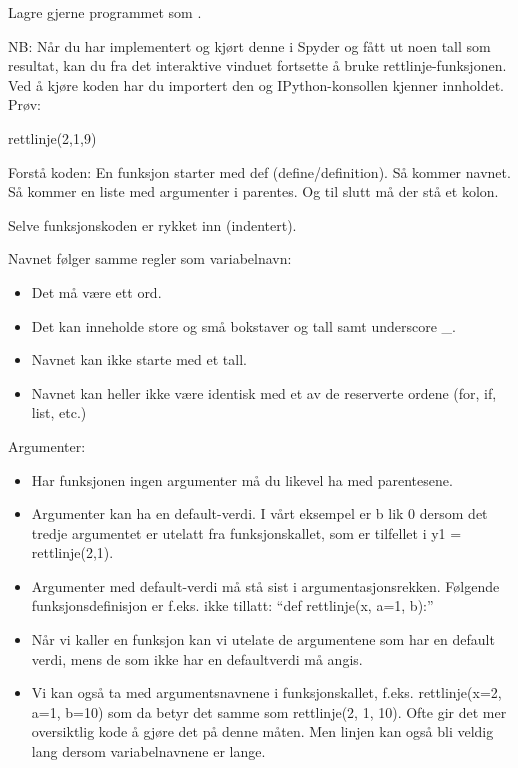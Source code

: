 {Lagre gjerne programmet som .

NB: Når du har implementert og kjørt denne i Spyder og fått ut noen tall som resultat, kan du fra det interaktive vinduet fortsette å bruke rettlinje-funksjonen. Ved å kjøre koden har du importert den og IPython-konsollen kjenner innholdet. 
Prøv:

\begin{usncodebox}
rettlinje(2,1,9) 
\end{usncodebox}

Forstå koden:
En funksjon starter med def (define/definition). Så kommer navnet. Så kommer en liste med argumenter i parentes. Og til slutt må der stå et kolon. 

Selve funksjonskoden er rykket inn (indentert).

Navnet følger samme regler som variabelnavn:
\begin{itemize}
\item Det må være ett ord.
\item Det kan inneholde store og små bokstaver og tall samt underscore \_.
\item Navnet kan ikke starte med et tall.
\item Navnet kan heller ikke være identisk med et av de reserverte ordene (for, if, list, etc.) 
\end{itemize}

Argumenter:
\begin{itemize}
\item Har funksjonen ingen argumenter må du likevel ha med parentesene. 
\item Argumenter kan ha en default-verdi. I vårt eksempel er b lik 0 dersom det tredje argumentet er utelatt fra funksjonskallet, som er tilfellet i y1 = rettlinje(2,1).
\item Argumenter med default-verdi må stå sist i argumentasjonsrekken. Følgende funksjonsdefinisjon er f.eks. ikke tillatt:  ``def rettlinje(x, a=1, b):''
\item Når vi kaller en funksjon kan vi utelate de argumentene som har en default verdi, mens de som ikke har en defaultverdi må angis. 
\item Vi kan også ta med argumentsnavnene i funksjonskallet, f.eks. rettlinje(x=2, a=1, b=10) som da betyr det samme som rettlinje(2, 1, 10). Ofte gir det mer oversiktlig kode å gjøre det på denne måten. Men linjen kan også bli veldig lang dersom variabelnavnene er lange. 
\end{itemize}

}
